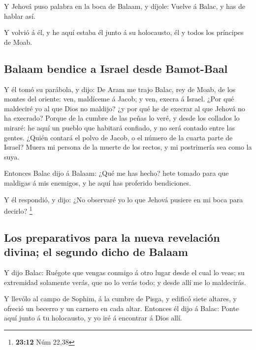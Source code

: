  Y Jehová puso palabra en la boca de Balaam, y díjole:
Vuelve á Balac, y has de hablar así.

 Y volvió á él, y he aquí estaba él junto á su holocausto,
él y todos los príncipes de Moab.

\hypertarget{balaam-bendice-a-israel-desde-bamot-baal}{%
\subsection{Balaam bendice a Israel desde
Bamot-Baal}\label{balaam-bendice-a-israel-desde-bamot-baal}}

 Y él tomó su parábola, y dijo: De Aram me trajo Balac, rey
de Moab, de los montes del oriente: ven, maldíceme á Jacob; y ven,
execra á Israel.  ¿Por qué maldeciré yo al que Dios no
maldijo? ¿y por qué he de execrar al que Jehová no ha execrado?
 Porque de la cumbre de las peñas lo veré, y desde los
collados lo miraré: he aquí un pueblo que habitará confiado, y no será
contado entre las gentes.  ¿Quién contará el polvo de
Jacob, o el número de la cuarta parte de Israel? Muera mi persona de la
muerte de los rectos, y mi postrimería sea como la suya.

 Entonces Balac dijo á Balaam: ¿Qué me has hecho? hete
tomado para que maldigas á mis enemigos, y he aquí has proferido
bendiciones.

 Y él respondió, y dijo: ¿No observaré yo lo que Jehová
pusiere en mi boca para decirlo? \footnote{\textbf{23:12} Núm 22,38}

\hypertarget{los-preparativos-para-la-nueva-revelaciuxf3n-divina-el-segundo-dicho-de-balaam}{%
\subsection{Los preparativos para la nueva revelación divina; el segundo
dicho de
Balaam}\label{los-preparativos-para-la-nueva-revelaciuxf3n-divina-el-segundo-dicho-de-balaam}}

 Y dijo Balac: Ruégote que vengas conmigo á otro lugar
desde el cual lo veas; su extremidad solamente verás, que no lo verás
todo; y desde allí me lo maldecirás.

 Y llevólo al campo de Sophim, á la cumbre de Pisga, y
edificó siete altares, y ofreció un becerro y un carnero en cada altar.
 Entonces él dijo á Balac: Ponte aquí junto á tu
holocausto, y yo iré á encontrar á Dios allí.


